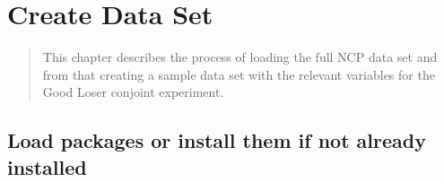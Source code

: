 \documentclass[]{book}
\begin{document}
\chapter{Create Data Set}\label{create-data-set-1}

\begin{quote}
This chapter describes the process of loading the full NCP data set and
from that creating a sample data set with the relevant variables for the
Good Loser conjoint experiment.
\end{quote}

\section{Load packages or install them if not already
installed}\label{load-packages-or-install-them-if-not-already-installed-1}
\end{document}
